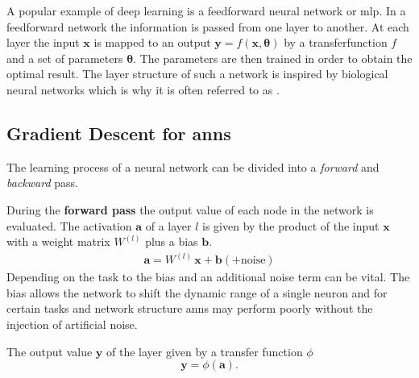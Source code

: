 A popular example of deep learning is a feedforward neural network or \gls{mlp}. In a feedforward network the information is passed from one layer to another. At each layer the input $\mathbf{x}$ is mapped to an output $\mathbf{y} = f(\mathbf{x, \theta})$ by a transferfunction $f$ and a set of parameters $\mathbf{\theta}$. The parameters are then trained in order to obtain the optimal result. The layer structure of such a network is inspired by biological neural networks which is why it is often referred to as .\\



\subsection{Gradient Descent for \glspl{ann}}
\label{trainingANN}
The learning process of a neural network can be divided into a \emph{forward} and \emph{backward} pass. 

During the \textbf{forward pass} the output value of each node in the network is evaluated. The activation $\mathbf{a}$ of a layer $l$ is given by the product of the input $\mathbf{x}$ with a weight matrix $W^{(l)}$ plus a bias $\mathbf{b}$.
\begin{align}
\label{activation}
\mathbf{a} = W^{(l)} \, \mathbf{x} + \mathbf{b} \left(+ \text{noise}\right)
\end{align}
Depending on the task to the bias and an additional noise term can be vital. The bias allows the network to shift the dynamic range of a single neuron and for certain tasks and network structure \glspl{ann} may perform poorly without the injection of artificial noise.

The output value $\mathbf{y}$ of the layer given by a transfer function $\phi$
\begin{equation}
\label{transferANN}
\mathbf{y} = \phi(\mathbf{a}).
\end{equation}

